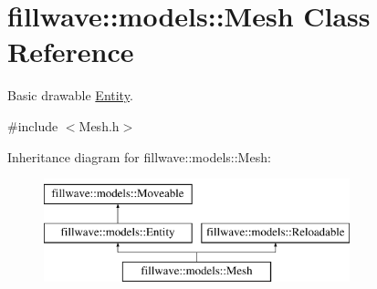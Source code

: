 \hypertarget{classfillwave_1_1models_1_1Mesh}{}\section{fillwave\+:\+:models\+:\+:Mesh Class Reference}
\label{classfillwave_1_1models_1_1Mesh}


Basic drawable \hyperlink{classfillwave_1_1models_1_1Entity}{Entity}.  




{\ttfamily \#include $<$Mesh.\+h$>$}

Inheritance diagram for fillwave\+:\+:models\+:\+:Mesh\+:\begin{figure}[H]
\begin{center}
\leavevmode
\includegraphics[height=3.000000cm]{classfillwave_1_1models_1_1Mesh}
\end{center}
\end{figure}
